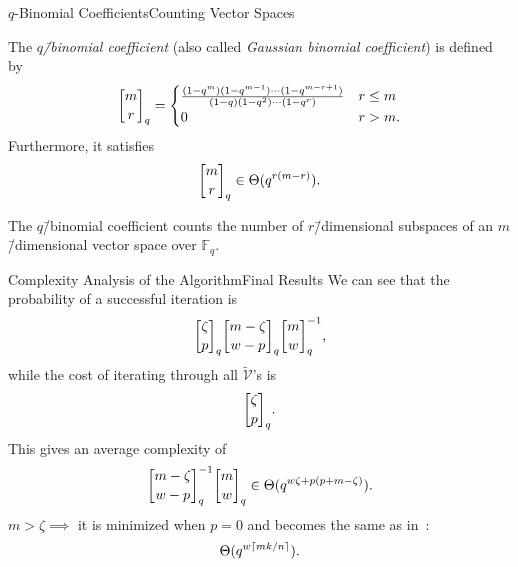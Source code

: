 \documentclass[usepdftitle=false]{beamer}
\newcommand*{\FF}{\ensuremath{\mathbb{F}}}
\DeclarePairedDelimiter{\ceil}{\lceil}{\rceil}
\DeclareRobustCommand{\qbinom}{\genfrac[]{0pt}{}}
\begin{document}
\begin{frame}{\(q\)-Binomial Coefficients}{Counting Vector Spaces}
  \begin{definition}
    The \emph{\(q\)\=/binomial coefficient} (also called
    \emph{Gaussian binomial coefficient}) is defined by
    \[
      \qbinom{m}{r}_q =
      \begin{cases}
        \frac{(1 - q^m) (1 - q^{m - 1}) \cdots (1 - q^{m - r + 1})}{(1 - q) (1 - q^2) \cdots (1 - q^r)} & r \le m\\
        0 & r > m\text.
      \end{cases}
    \]
    Furthermore, it satisfies
    \[
      \qbinom{m}{r}_q \in \Theta(q^{r (m - r)})\text.
    \]
  \end{definition}
  The \(q\)\=/binomial coefficient counts the \alert{number of
    \(r\)\=/dimensional subspaces of an \(m\)\=/dimensional vector
    space over \(\FF_q\)}.
\end{frame}

\begin{frame}{Complexity Analysis of the Algorithm}{Final Results}
  We can see that the probability of a successful iteration is
  \[
    \qbinom{\zeta}{p}_q \qbinom{m - \zeta}{w - p}_q \qbinom{m}{w}_q^{-1}\text,
  \]
  while the cost of iterating through all \(\tilde{\mathcal{V}}\)'s is
  \[
    \qbinom{\zeta}{p}_q\text.
  \]
  This gives an average complexity of
  \[
    \qbinom{m - \zeta}{w - p}_q^{-1} \qbinom{m}{w}_q \in \Theta(q^{w
      \zeta + p (p + m - \zeta)})\text.
  \]
  \(m > \zeta \implies\) it is minimized when \alert{\(p = 0\)} and
  becomes the same as in~\cite{GRS13}:
  \[
    \Theta(q^{w \ceil{m k / {n}}}).
  \]
\end{frame}

\begin{frame}[allowframebreaks]
  \printbibliography{}
\end{frame}
\end{document}
